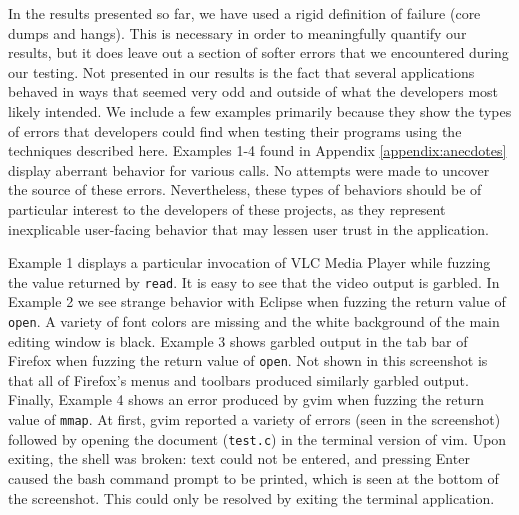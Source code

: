 In the results presented so far, we have used a rigid definition of failure (core dumps and hangs). This is necessary in order to meaningfully quantify our results, but it does leave out a section of softer errors that we encountered during our testing. Not presented in our results is the fact that several applications behaved in ways that seemed very odd and outside of what the developers most likely intended. We include a few examples primarily because they show the types of errors that developers could find when testing their programs using the techniques described here. Examples 1-4 found in Appendix \ref{appendix:anecdotes} display aberrant behavior for various calls. No attempts were made to uncover the source of these errors. Nevertheless, these types of behaviors should be of particular interest to the developers of these projects, as they represent inexplicable user-facing behavior that may lessen user trust in the application.

Example 1 displays a particular invocation of VLC Media Player while fuzzing the value returned by \texttt{read}. It is easy to see that the video output is garbled. In Example 2 we see strange behavior with Eclipse when fuzzing the return value of \texttt{open}. A variety of font colors are missing and the white background of the main editing window is black. Example 3 shows garbled output in the tab bar of Firefox when fuzzing the return value of \texttt{open}. Not shown in this screenshot is that all of Firefox's menus and toolbars produced similarly garbled output. Finally, Example 4 shows an error produced by gvim when fuzzing the return value of \texttt{mmap}. At first, gvim reported a variety of errors (seen in the screenshot) followed by opening the document (\texttt{test.c}) in the terminal version of vim. Upon exiting, the shell was broken: text could not be entered, and pressing Enter caused the bash command prompt to be printed, which is seen at the bottom of the screenshot. This could only be resolved by exiting the terminal application.